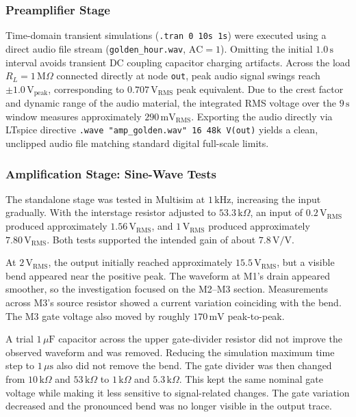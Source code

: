 \documentclass[conference]{IEEEtran}
\begin{document}
\subsubsection{Preamplifier Stage}
Time-domain transient simulations (\texttt{.tran 0 10s 1s}) were executed using a direct audio file stream (\texttt{golden\_hour.wav}, $\text{AC} = 1$). Omitting the initial $1.0\,\mathrm{s}$ interval avoids transient DC coupling capacitor charging artifacts. Across the load $R_L = 1\,\mathrm{M}\Omega$ connected directly at node \texttt{out}, peak audio signal swings reach $\pm1.0\,\mathrm{V_{peak}}$, corresponding to $0.707\,\mathrm{V_{RMS}}$ peak equivalent. Due to the crest factor and dynamic range of the audio material, the integrated RMS voltage over the $9\,\mathrm{s}$ window measures approximately $290\,\mathrm{mV_{RMS}}$. Exporting the audio directly via LTspice directive \texttt{.wave "amp\_golden.wav" 16 48k V(out)} yields a clean, unclipped audio file matching standard digital full-scale limits.

\subsubsection{Amplification Stage: Sine-Wave Tests}
The standalone stage was tested in Multisim at $1\,\mathrm{kHz}$, increasing the input gradually. With the interstage resistor adjusted to $53.3\,\mathrm{k}\Omega$, an input of $0.2\,\mathrm{V_{RMS}}$ produced approximately $1.56\,\mathrm{V_{RMS}}$, and $1\,\mathrm{V_{RMS}}$ produced approximately $7.80\,\mathrm{V_{RMS}}$. Both tests supported the intended gain of about $7.8\,\mathrm{V/V}$.

At $2\,\mathrm{V_{RMS}}$, the output initially reached approximately $15.5\,\mathrm{V_{RMS}}$, but a visible bend appeared near the positive peak. The waveform at M1's drain appeared smoother, so the investigation focused on the M2--M3 section. Measurements across M3's source resistor showed a current variation coinciding with the bend. The M3 gate voltage also moved by roughly $170\,\mathrm{mV}$ peak-to-peak.

A trial $1\,\mu\mathrm{F}$ capacitor across the upper gate-divider resistor did not improve the observed waveform and was removed. Reducing the simulation maximum time step to $1\,\mu\mathrm{s}$ also did not remove the bend. The gate divider was then changed from $10\,\mathrm{k}\Omega$ and $53\,\mathrm{k}\Omega$ to $1\,\mathrm{k}\Omega$ and $5.3\,\mathrm{k}\Omega$. This kept the same nominal gate voltage while making it less sensitive to signal-related changes. The gate variation decreased and the pronounced bend was no longer visible in the output trace.
\end{document}
